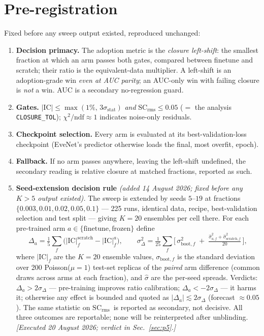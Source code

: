 \documentclass[11pt]{article}
\newcommand{\IC}{\ensuremath{\mathrm{IC}}}
\newcommand{\SCr}{\ensuremath{\mathrm{SC_{rms}}}}
\begin{document}
\section{Pre-registration}
\label{sec:prereg}

Fixed before any sweep output existed, reproduced unchanged:

\begin{enumerate}[label=(P\arabic*),leftmargin=2.6em]
\item \textbf{Decision primacy.} The adoption metric is the \emph{closure left-shift}: the
  smallest fraction at which an arm passes both gates, compared between finetune and
  scratch; their ratio is the equivalent-data multiplier. A left-shift is an adoption-grade
  win \emph{even at AUC parity}; an AUC-only win with failing closure is \emph{not} a win.
  AUC is a secondary no-regression guard.
\item \textbf{Gates.} $|\IC| \le \max(1\%,\,3\sigma_{\mathrm{stat}})$ \emph{and}
  $\SCr \le 0.05$ ($=$ the analysis \texttt{CLOSURE\_TOL}); $\chi^2/\mathrm{ndf}\approx 1$
  indicates noise-only residuals.
\item \textbf{Checkpoint selection.} Every arm is evaluated at its best-validation-loss
  checkpoint (EveNet's predictor otherwise loads the final, most overfit, epoch).
\item \textbf{Fallback.} If no arm passes anywhere, leaving the left-shift undefined, the
  secondary reading is relative closure at matched fractions, reported as such.
\item \textbf{Seed-extension decision rule} \emph{(added 14 August 2026; fixed before any
  $K>5$ output existed).} The sweep is extended by seeds $5$--$19$ at fractions
  $\{0.003, 0.01, 0.02, 0.05, 0.1\}$ --- 225 runs, identical data, recipe,
  best-validation selection and test split --- giving $K{=}20$ ensembles per cell there.
  For each pre-trained arm $a \in \{\text{finetune}, \text{frozen}\}$ define
  \[ \Delta_a = \tfrac{1}{5}\sum_f \big( |\IC|^{\mathrm{scratch}}_f - |\IC|^{a}_f \big),
     \qquad
     \sigma_{\Delta}^2 = \tfrac{1}{25}\sum_f \Big[\,
     \sigma^2_{\mathrm{boot},f} \;+\;
     \tfrac{\hat\sigma^2_{a,f} + \hat\sigma^2_{\mathrm{scratch},f}}{20} \,\Big], \]
  where $|\IC|_f$ are the $K{=}20$ ensemble values, $\sigma_{\mathrm{boot},f}$ is the
  standard deviation over 200 Poisson($\mu{=}1$) test-set replicas of the \emph{paired}
  arm difference (common draws across arms at each fraction), and $\hat\sigma$ are the
  per-seed spreads. Verdicts: $\Delta_a > 2\sigma_\Delta$ --- pre-training improves ratio
  calibration; $\Delta_a < -2\sigma_\Delta$ --- it harms it; otherwise any effect is
  bounded and quoted as $|\Delta_a| \lesssim 2\sigma_\Delta$ (forecast ${\approx}0.05$).
  The same statistic on \SCr\ is reported as secondary, not decisive. All three outcomes
  are reportable; none will be reinterpreted after unblinding.
  \emph{[Executed 20 August 2026; verdict in Sec.~\ref{sec:p5}.]}
\end{enumerate}
\end{document}
